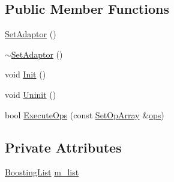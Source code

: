 \subsection*{Public Member Functions}
\begin{DoxyCompactItemize}
\item 
\hyperlink{classSetAdaptor_3_01BoostingList_01_4_a36f523d7f03cfcf11fcb82bdd2b5e59a}{Set\-Adaptor} ()
\item 
\hyperlink{classSetAdaptor_3_01BoostingList_01_4_a105d0946df380573f6017b3ed8f7e338}{$\sim$\-Set\-Adaptor} ()
\item 
void \hyperlink{classSetAdaptor_3_01BoostingList_01_4_ada03b9b436ec2d0370d615e85389fb6e}{Init} ()
\item 
void \hyperlink{classSetAdaptor_3_01BoostingList_01_4_aa08e46d11fb09f58823a0a1abcb66b5a}{Uninit} ()
\item 
bool \hyperlink{classSetAdaptor_3_01BoostingList_01_4_a5ff7ffb959ad1d1747a425020ba71f48}{Execute\-Ops} (const \hyperlink{setadaptor_8h_a7af6ba4d94b446744e0e49accfb08e24}{Set\-Op\-Array} \&\hyperlink{stmskip_8cc_a91ee67dbc899b78fabcd2bfc4643d307}{ops})
\end{DoxyCompactItemize}
\subsection*{Private Attributes}
\begin{DoxyCompactItemize}
\item 
\hyperlink{classBoostingList}{Boosting\-List} \hyperlink{classSetAdaptor_3_01BoostingList_01_4_a3286d56d32c5e2288e0800c96375ca93}{m\-\_\-list}
\end{DoxyCompactItemize}


